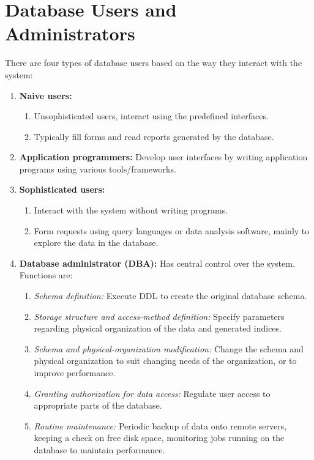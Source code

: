 \documentclass[journal,12pt,twocolumn]{IEEEtran}
\begin{document}
\section{Database Users and Administrators}

There are four types of database users based on the way they interact with the 
system:
\begin{enumerate}
    \item \textbf{Naive users:}
    \begin{enumerate}
        \item Unsophisticated users, interact using the predefined interfaces.
        \item Typically fill forms and read reports generated by the database.
    \end{enumerate}

    \item \textbf{Application programmers:} Develop user interfaces by writing 
    application programs using various tools/frameworks.

    \item \textbf{Sophisticated users:}
    \begin{enumerate}
        \item Interact with the system without writing programs.
        \item Form requests using query languages or data analysis software, 
        mainly to explore the data in the database.
    \end{enumerate}

    \item \textbf{Database administrator (DBA):} Has central control over the 
    system. Functions are:
    \begin{enumerate}
        \item \textit{Schema definition:} Execute DDL to create the original 
        database schema.
        \item \textit{Storage structure and access-method definition:} Specify 
        parameters regarding physical organization of the data and generated indices.
        \item \textit{Schema and physical-organization modification:} Change 
        the schema and physical organization to suit changing needs of the 
        organization, or to improve performance.
        \item \textit{Granting authorization for data access:} Regulate user 
        access to appropriate parts of the database.
        \item \textit{Routine maintenance:} Periodic backup of data onto remote 
        servers, keeping a check on free disk space, monitoring jobs running on 
        the database to maintain performance.
    \end{enumerate}
\end{enumerate}
\end{document}
